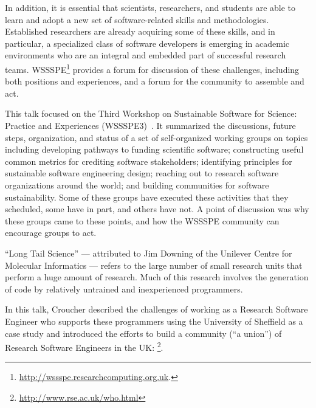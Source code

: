 \documentclass[a4paper,UKenglish]{dagrep}
\begin{document}
In addition, it is essential that scientists, researchers, and students are able to learn and adopt a new set of software-related skills and methodologies. Established researchers are already acquiring some of these skills, and in particular, a specialized class of software developers is emerging in academic environments who are an integral and embedded part of successful research teams. WSSSPE\footnote{\url{http://wssspe.researchcomputing.org.uk}.} provides a forum for discussion of these challenges, including both positions and experiences, and a forum for the community to assemble and act.

This talk focused on the Third Workshop on Sustainable Software for Science: Practice and Experiences (WSSSPE3)~\cite{wssspe3}. It summarized the discussions, future steps, organization, and status of a set of self-organized working groups on topics including developing pathways to funding scientific software; constructing useful common metrics for crediting software stakeholders; identifying principles for sustainable software engineering design; reaching out to research software organizations around the world; and building communities for software sustainability. Some of these groups have executed these activities that they scheduled, some have in part, and others have not.  A point of discussion was why these groups came to these points, and how the WSSSPE community can encourage groups to act.


``Long Tail Science'' --- attributed to Jim Downing of the Unilever Centre for Molecular Informatics --- refers to the large number of small research units that perform a huge amount of research. Much of this research involves the generation of code by relatively untrained and inexperienced programmers.

In this talk, Croucher described the challenges of working as a Research Software Engineer who supports these programmers using the University of Sheffield as a case study and introduced the efforts to build a community (``a union'') of Research Software Engineers in the UK: \footnote{\url{http://www.rse.ac.uk/who.html}}.

\end{document}
